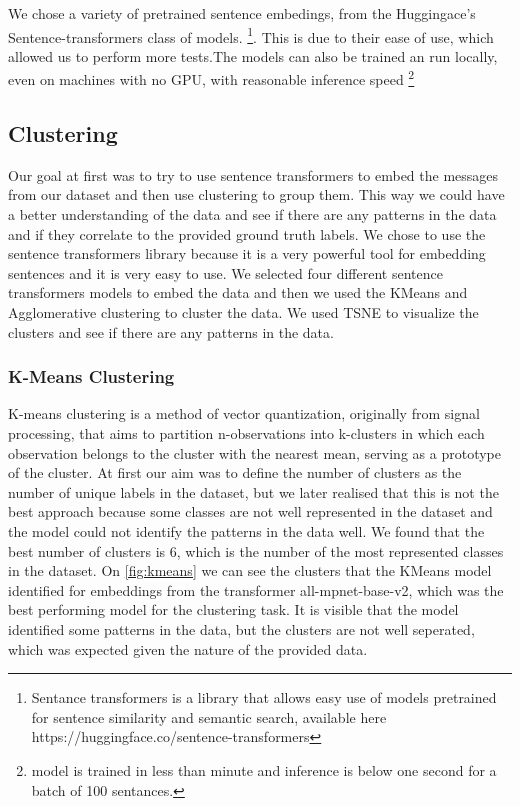 \documentclass[fleqn,moreauthors,10pt]{ds_report}
\begin{document}
We chose a variety of pretrained sentence embedings, from the Huggingace's Sentence-transformers class of models.
\footnote{Sentance transformers is a library that allows easy use of models pretrained for sentence similarity and semantic search, available here https://huggingface.co/sentence-transformers}.
This is due to their ease of use, which allowed us to perform more tests.The models can also be trained an run locally, even on machines with no GPU, with reasonable inference speed \footnote{model is trained in less than  minute and inference is below one second for a batch of 100 sentances.}

\subsection{Clustering}
Our goal at first was to try to use sentence transformers to embed the messages from our dataset and then use clustering to group them.
This way we could have a better understanding of the data and see if there are any patterns in the data and if they correlate to the provided ground truth labels.
We chose to use the sentence transformers library because it is a very powerful tool for embedding sentences and it is very easy to use.
We selected four different sentence transformers models to embed the data and then we used the KMeans and Agglomerative clustering to cluster the data.
We used TSNE to visualize the clusters and see if there are any patterns in the data.

\subsubsection{K-Means Clustering}
K-means clustering is a method of vector quantization, originally from signal processing, that aims to partition n-observations into k-clusters in which each observation belongs to the cluster with the nearest mean, serving as a prototype of the cluster.
At first our aim was to define the number of clusters as the number of unique labels in the dataset, but we later realised that this is not the best approach because some classes are not well represented in the dataset and the model could not identify the patterns in the data well.
We found that the best number of clusters is 6, which is the number of the most represented classes in the dataset.
On \ref{fig:kmeans} we can see the clusters that the KMeans model identified for embeddings from the transformer all-mpnet-base-v2, 
which was the best performing model for the clustering task. It is visible that the model identified some patterns in the data, but the clusters are not well seperated, 
which was expected given the nature of the provided data.
\end{document}
